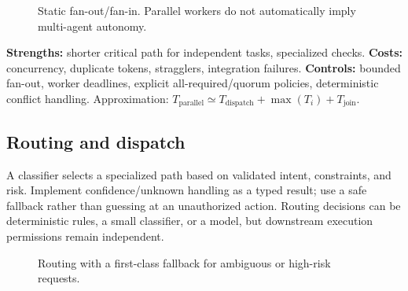 \begin{figure}[htbp]\centering
{}
\caption{Static fan-out/fan-in. Parallel workers do not automatically imply multi-agent autonomy.}
\label{fig:parallel}
\end{figure}

\textbf{Strengths:} shorter critical path for independent tasks, specialized checks. \textbf{Costs:} concurrency, duplicate tokens, stragglers, integration failures. \textbf{Controls:} bounded fan-out, worker deadlines, explicit all-required/quorum policies, deterministic conflict handling. Approximation: $T_{\mathrm{parallel}}\simeq T_{\mathrm{dispatch}}+\max(T_i)+T_{\mathrm{join}}$.

\subsection{Routing and dispatch}
A classifier selects a specialized path based on validated intent, constraints, and risk. Implement confidence/unknown handling as a typed result; use a safe fallback rather than guessing at an unauthorized action. Routing decisions can be deterministic rules, a small classifier, or a model, but downstream execution permissions remain independent.

\begin{figure}[htbp]\centering
{}
\caption{Routing with a first-class fallback for ambiguous or high-risk requests.}
\label{fig:routing}
\end{figure}

